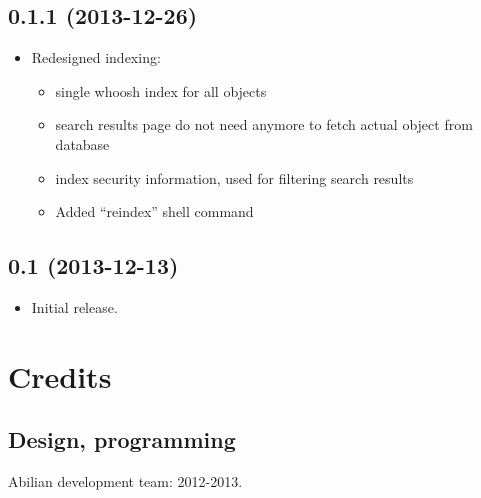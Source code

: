 \documentclass[a4paper,12pt,english]{sphinxmanual}
\begin{document}
\section{0.1.1 (2013-12-26)}
\label{changelog:id13}\begin{itemize}
\item {} 
Redesigned indexing:
\begin{itemize}
\item {} 
single whoosh index for all objects

\item {} 
search results page do not need anymore to fetch actual object from database

\item {} 
index security information, used for filtering search results

\item {} 
Added ``reindex'' shell command

\end{itemize}

\end{itemize}


\section{0.1 (2013-12-13)}
\label{changelog:id14}\begin{itemize}
\item {} 
Initial release.

\end{itemize}


\chapter{Credits}
\label{credits:credits}\label{credits::doc}

\section{Design, programming}
\label{credits:design-programming}
Abilian development team: 2012-2013.
\end{document}
